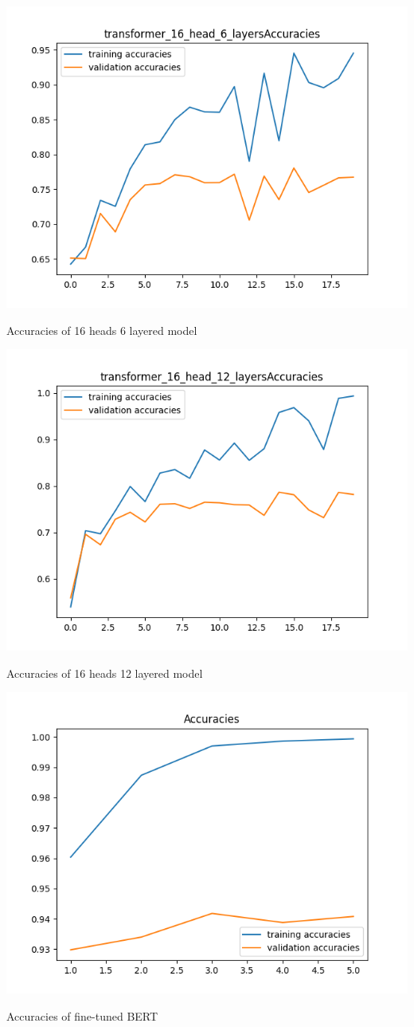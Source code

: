\documentclass{article}
\begin{document}
\begin{minipage}{0.49\textwidth}
 \centering
 \includegraphics[width=1\linewidth]{transformer_16_head_6_layers_Accuracies.png}
 \caption{Accuracies of 16 heads 6 layered model}
\end{minipage}\hfill
\begin{minipage}{0.49\textwidth}
 \centering
 \includegraphics[width=1\linewidth]{transformer_16_head_12_layers_Accuracies.png}
 \caption{Accuracies of 16 heads 12 layered model}
\end{minipage}\hfill
\begin{minipage}{0.49\textwidth}
 \centering
 \includegraphics[width=1\linewidth]{BERT_Accuracies.png}
 \caption{Accuracies of fine-tuned BERT}
\end{minipage}\hfill
\end{document}
